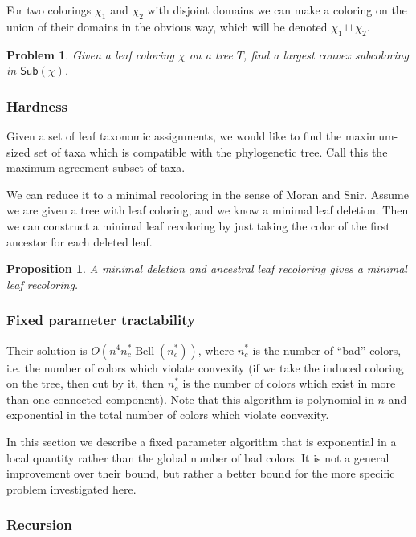 \documentclass{amsart}
\newcommand{\col}{\chi}
\newcommand{\subcolS}{\mathsf{Sub}}
\newcommand{\Bell}{\operatorname{Bell}}
\newcommand{\nbadcolors}{n_c^*}
\newtheorem{prop}{Proposition}
\newtheorem{problem}{Problem}
\begin{document}
For two colorings $\col_1$ and $\col_2$ with disjoint domains we can make a coloring on the union of their domains in the obvious way, which will be denoted $\col_1 \sqcup \col_2$.

\begin{problem}
\label{prob:subcolor}
  Given a leaf coloring $\col$ on a tree $T$, find a largest convex subcoloring in $\subcolS(\col)$.
\end{problem}

\subsubsection{Hardness}
Given a set of leaf taxonomic assignments, we would like to find the maximum-sized set of taxa which is compatible with the phylogenetic tree.
Call this the maximum agreement subset of taxa.

We can reduce it to a minimal recoloring in the sense of Moran and Snir.
Assume we are given a tree with leaf coloring, and we know a minimal leaf deletion.
Then we can construct a minimal leaf recoloring by just taking the color of the first ancestor for each deleted leaf.

\begin{prop}
  A minimal deletion and ancestral leaf recoloring gives a minimal leaf recoloring.
\end{prop}

\subsubsection{Fixed parameter tractability}
Their solution is $O(n^4 \nbadcolors \Bell(\nbadcolors))$, where $\nbadcolors$ is the number of ``bad'' colors, i.e. the number of colors which violate convexity (if we take the induced coloring on the tree, then cut by it, then $\nbadcolors$ is the number of colors which exist in more than one connected component).
Note that this algorithm is polynomial in $n$ and exponential in the total number of colors which violate convexity.

In this section we describe a fixed parameter algorithm that is exponential in a local quantity rather than the global number of bad colors.
It is not a general improvement over their bound, but rather a better bound for the more specific problem investigated here.


\subsubsection{Recursion}
\end{document}
